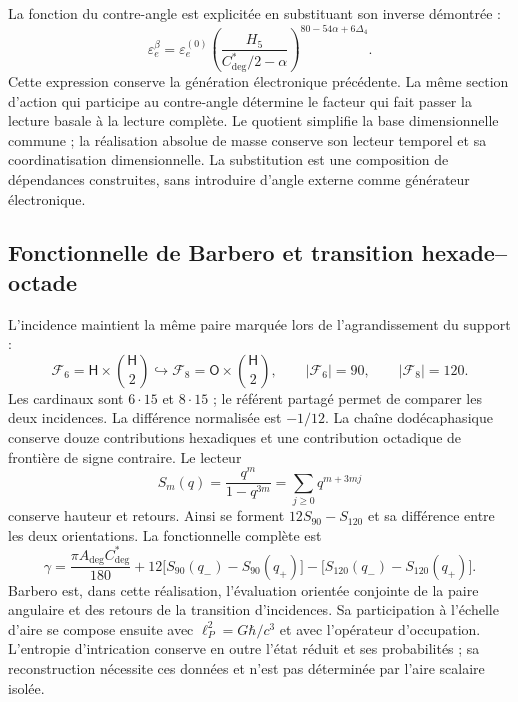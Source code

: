 La fonction du contre-angle est explicitée en substituant son inverse démontrée :
\begin{equation}
 \boxed{\varepsilon_e^\beta=\varepsilon_e^{(0)}
 \left(\frac{H_5}{C^*_{\deg}/2-\alpha}\right)^{80-54\alpha+6\Delta_4}.}
 \label{md:compos:electron-contraangulo}
\end{equation}
Cette expression conserve la génération électronique précédente. La même
section d’action qui participe au contre-angle détermine le facteur qui
fait passer la lecture basale à la lecture complète. Le quotient simplifie la base dimensionnelle
commune ; la réalisation absolue de masse conserve son lecteur temporel et sa coordinatisation
dimensionnelle. La substitution est une composition de dépendances construites,
sans introduire d’angle externe comme générateur électronique.

\subsection{Fonctionnelle de Barbero et transition hexade--octade}
\label{md:compos:barbero}

L’incidence maintient la même paire marquée lors de l’agrandissement du support :
\begin{equation}
 \mathcal F_6=\mathsf H\times\binom{\mathsf H}{2}
 \hookrightarrow
 \mathcal F_8=\mathsf O\times\binom{\mathsf H}{2},
 \qquad |\mathcal F_6|=90,\qquad |\mathcal F_8|=120.
 \label{md:compos:incidencia}
\end{equation}
Les cardinaux sont $6\cdot15$ et $8\cdot15$ ; le référent partagé permet de
comparer les deux incidences. La différence normalisée est $-1/12$. La chaîne
dodécaphasique conserve douze contributions hexadiques et une contribution
octadique de frontière de signe contraire. Le lecteur
\begin{equation}
 S_m(q)=\frac{q^m}{1-q^{3m}}
 =\sum_{j\geq0}q^{m+3mj}
 \label{md:compos:serie-retorno}
\end{equation}
conserve hauteur et retours. Ainsi se forment $12S_{90}-S_{120}$ et sa différence
entre les deux orientations. La fonctionnelle complète est
\begin{equation}
 \gamma=\frac{\pi A_{\deg}C^*_{\deg}}{180}
 +12\bigl[S_{90}(q_-)-S_{90}(q_+)\bigr]
 -\bigl[S_{120}(q_-)-S_{120}(q_+)\bigr].
 \label{md:compos:funcional-barbero}
\end{equation}
Barbero est, dans cette réalisation, l’évaluation orientée conjointe de la paire
angulaire et des retours de la transition d’incidences. Sa participation
à l’échelle d’aire se compose ensuite avec $\ell_P^2=G\hbar/c^3$ et avec
l’opérateur d’occupation. L’entropie d’intrication conserve en outre
l’état réduit et ses probabilités ; sa reconstruction nécessite ces données
et n’est pas déterminée par l’aire scalaire isolée.

